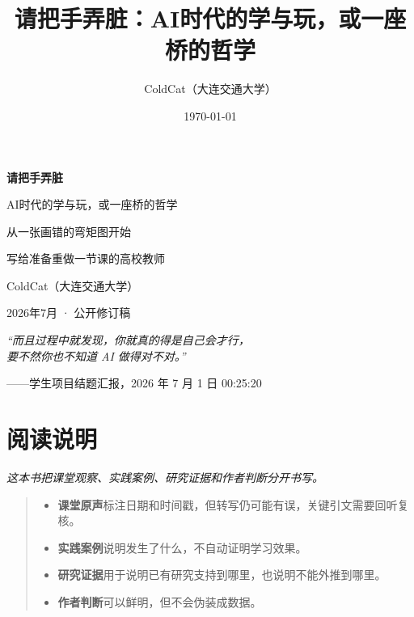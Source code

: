 \documentclass[UTF8,a4paper,openany,12pt]{ctexbook}
\title{请把手弄脏：AI时代的学与玩，或一座桥的哲学}
\author{ColdCat（大连交通大学）}
\date{\today}
\begin{document}
\begin{titlepage}
\centering
\vspace*{4cm}

{\Huge\bfseries 请把手弄脏}

\vspace{0.8cm}

{\LARGE AI时代的学与玩，或一座桥的哲学}

\vspace{2cm}

{\large 从一张画错的弯矩图开始}

\vspace{0.8cm}

{\large 写给准备重做一节课的高校教师}

\vspace{3cm}

{\large ColdCat（大连交通大学）}

\vfill

{\small\color{muted} 2026年7月 · 公开修订稿}

\end{titlepage}

\thispagestyle{empty}
\vspace*{3cm}

\begin{center}
{\large\itshape
``而且过程中就发现，你就真的得是自己会才行，\\
要不然你也不知道 AI 做得对不对。''}

\vspace{1cm}
——学生项目结题汇报，2026 年 7 月 1 日 00:25:20
\end{center}

\tableofcontents

\chapter*{阅读说明}

\begin{center}
{\large\itshape 这本书把课堂观察、实践案例、研究证据和作者判断分开书写。}
\end{center}

\vspace{1cm}

\begin{quote}
\begin{itemize}[left=0pt]
  \item \textbf{课堂原声}标注日期和时间戳，但转写仍可能有误，关键引文需要回听复核。
  \item \textbf{实践案例}说明发生了什么，不自动证明学习效果。
  \item \textbf{研究证据}用于说明已有研究支持到哪里，也说明不能外推到哪里。
  \item \textbf{作者判断}可以鲜明，但不会伪装成数据。
\end{itemize}
\end{quote}
\end{document}
